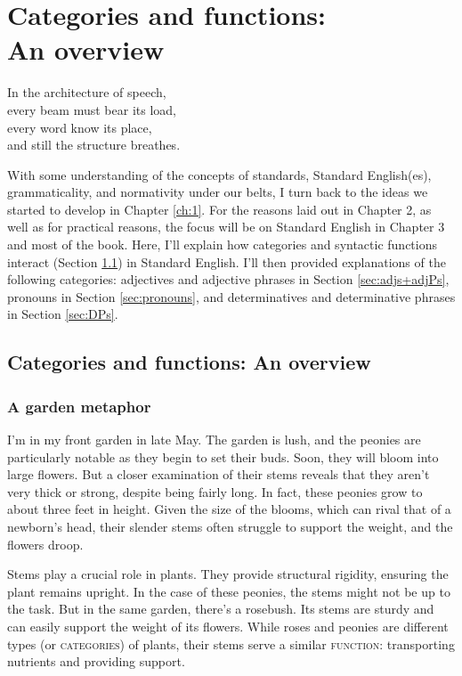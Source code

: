 \chapter{Categories and functions: \\An overview} \label{ch:categories}

\epigraph{In the architecture of speech,\\
every beam must bear its load,\\
every word know its place,\\
and still the structure breathes.}{}

With some understanding of the concepts of standards, Standard English(es), grammaticality, and normativity under our belts, I turn back to the ideas we started to develop in Chapter \ref{ch:1}. For the reasons laid out in Chapter 2, as well as for practical reasons, the focus will be on Standard English in Chapter 3 and most of the book. Here, I'll explain how categories and syntactic functions interact (Section \ref{sec:cat-funct}) in Standard English. I'll then provided explanations of the following categories: adjectives and adjective phrases in Section \ref{sec:adjs+adjPs}, pronouns in Section \ref{sec:pronouns}, and determinatives and determinative phrases in Section \ref{sec:DPs}.

\section{Categories and functions: An overview}\label{sec:cat-funct}
\subsection*{A garden metaphor}

I'm in my front garden in late May. The garden is lush, and the peonies are particularly notable as they begin to set their buds. Soon, they will bloom into large flowers. But a closer examination of their stems reveals that they aren't very thick or strong, despite being fairly long. In fact, these peonies grow to about three feet in height. Given the size of the blooms, which can rival that of a newborn's head, their slender stems often struggle to support the weight, and the flowers droop.

Stems play a crucial role in plants. They provide structural rigidity, ensuring the plant remains upright. In the case of these peonies, the stems might not be up to the task. But in the same garden, there's a rosebush. Its stems are sturdy and can easily support the weight of its flowers. While roses and peonies are different types (or \textsc{categories}) of plants, their stems serve a similar \textsc{function}: transporting nutrients and providing support.

